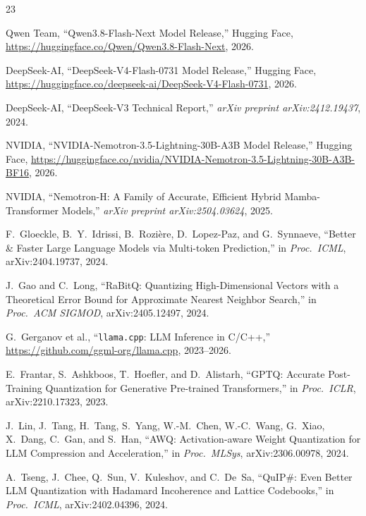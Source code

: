 \documentclass[10pt,twocolumn]{article}
\begin{document}
\FloatBarrier
\raggedbottom
{\small
\begin{thebibliography}{23}
\setlength{\itemsep}{1.5pt}
\setlength{\parskip}{0pt}

Qwen Team, ``Qwen3.8-Flash-Next Model Release,'' Hugging Face, \url{https://huggingface.co/Qwen/Qwen3.8-Flash-Next}, 2026.

DeepSeek-AI, ``DeepSeek-V4-Flash-0731 Model Release,'' Hugging Face, \url{https://huggingface.co/deepseek-ai/DeepSeek-V4-Flash-0731}, 2026.

DeepSeek-AI, ``DeepSeek-V3 Technical Report,'' \emph{arXiv preprint arXiv:2412.19437}, 2024.

NVIDIA, ``NVIDIA-Nemotron-3.5-Lightning-30B-A3B Model Release,'' Hugging Face, \url{https://huggingface.co/nvidia/NVIDIA-Nemotron-3.5-Lightning-30B-A3B-BF16}, 2026.

NVIDIA, ``Nemotron-H: A Family of Accurate, Efficient Hybrid Mamba-Transformer Models,'' \emph{arXiv preprint arXiv:2504.03624}, 2025.

F.~Gloeckle, B.~Y.~Idrissi, B.~Rozi\`ere, D.~Lopez-Paz, and G.~Synnaeve, ``Better \& Faster Large Language Models via Multi-token Prediction,'' in \emph{Proc.\ ICML}, arXiv:2404.19737, 2024.

J.~Gao and C.~Long, ``RaBitQ: Quantizing High-Dimensional Vectors with a Theoretical Error Bound for Approximate Nearest Neighbor Search,'' in \emph{Proc.\ ACM SIGMOD}, arXiv:2405.12497, 2024.

G.~Gerganov et al., ``\texttt{llama.cpp}: LLM Inference in C/C++,'' \url{https://github.com/ggml-org/llama.cpp}, 2023--2026.

E.~Frantar, S.~Ashkboos, T.~Hoefler, and D.~Alistarh, ``GPTQ: Accurate Post-Training Quantization for Generative Pre-trained Transformers,'' in \emph{Proc.\ ICLR}, arXiv:2210.17323, 2023.

J.~Lin, J.~Tang, H.~Tang, S.~Yang, W.-M.~Chen, W.-C.~Wang, G.~Xiao, X.~Dang, C.~Gan, and S.~Han, ``AWQ: Activation-aware Weight Quantization for LLM Compression and Acceleration,'' in \emph{Proc.\ MLSys}, arXiv:2306.00978, 2024.

A.~Tseng, J.~Chee, Q.~Sun, V.~Kuleshov, and C.~De~Sa, ``QuIP\#: Even Better LLM Quantization with Hadamard Incoherence and Lattice Codebooks,'' in \emph{Proc.\ ICML}, arXiv:2402.04396, 2024.


\end{thebibliography}}
\end{document}

